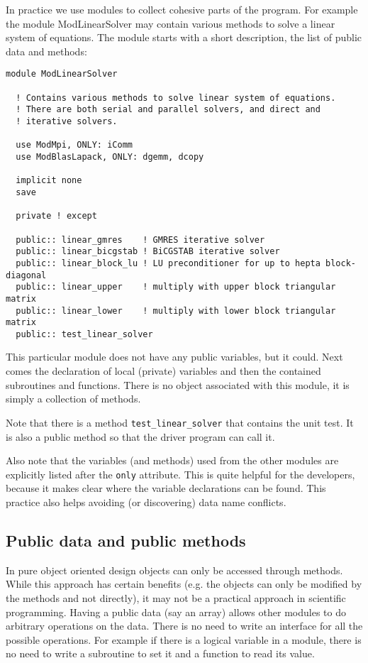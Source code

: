 \documentclass{article}
\begin{document}
In practice we use modules to collect cohesive parts of the program. 
For example the module ModLinearSolver may contain various methods to 
solve a linear system of equations. The module starts with a short 
description, the list of public data and methods:
\begin{verbatim}
module ModLinearSolver

  ! Contains various methods to solve linear system of equations.
  ! There are both serial and parallel solvers, and direct and 
  ! iterative solvers.

  use ModMpi, ONLY: iComm
  use ModBlasLapack, ONLY: dgemm, dcopy

  implicit none
  save

  private ! except

  public:: linear_gmres    ! GMRES iterative solver
  public:: linear_bicgstab ! BiCGSTAB iterative solver
  public:: linear_block_lu ! LU preconditioner for up to hepta block-diagonal 
  public:: linear_upper    ! multiply with upper block triangular matrix
  public:: linear_lower    ! multiply with lower block triangular matrix
  public:: test_linear_solver
\end{verbatim}
This particular module does not have any public variables, but it could.
Next comes the declaration of local (private) variables and then the 
contained subroutines and functions. There is no object associated with
this module, it is simply a collection of methods. 

Note that there is a method {\tt test\_linear\_solver} that contains the
unit test. It is also a public method so that the driver program can call it.

Also note that the variables (and methods) used from the other modules are 
explicitly listed after the {\tt only} attribute. 
This is quite helpful for the developers, because it makes clear where 
the variable declarations can be found. This practice also helps avoiding 
(or discovering) data name conflicts.

\subsection{Public data and public methods}

In pure object oriented design objects can only be accessed through methods.
While this approach has certain benefits (e.g. the objects can only be modified
by the methods and not directly), it may not be a practical approach in 
scientific programming. Having a public data (say an array) allows other
modules to do arbitrary operations on the data. There is no need to write
an interface for all the possible operations. For example if there is a logical
variable in a module, there is no need to write a subroutine to set it and
a function to read its value. 
\end{document}

